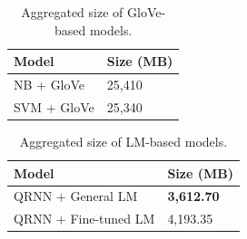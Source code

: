 \documentclass[a4paper,twoside,phd]{BYUPhys}
\begin{document}
\begin{table}[H]
	\centering
	\caption{Aggregated size of GloVe-based models.}	
	\begin{tabular}{|p{4.2cm}|p{5cm}|}
		\hline
		
		\textbf{Model} & \textbf{Size (MB)}                                                                                                                                                                                                                                                                                                                                                    \\
		\hline                                                                                                                                              
		NB + GloVe & 25,410 \\
		\hline
		
		SVM + GloVe & 25,340 \\
		\hline

		
	\end{tabular}
	\label{table:PreTrainedStorageRequirements}
\end{table}

\begin{table}[H]
	\centering
	\caption{Aggregated size of LM-based models.}	
	\begin{tabular}{|p{4.2cm}|p{5cm}|}
		\hline
		
		\textbf{Model} & \textbf{Size (MB)}                                                                                                                                                                                                                                                                                                                                                    \\
		\hline                                                                                                                                              
		QRNN + \newline General LM  & \textbf{3,612.70}  \\
		\hline
		
		QRNN + \newline Fine-tuned LM  & 4,193.35  \\
		\hline
		
		
	\end{tabular}
	\label{table:LMStorageRequirements}
\end{table}
\end{document}
